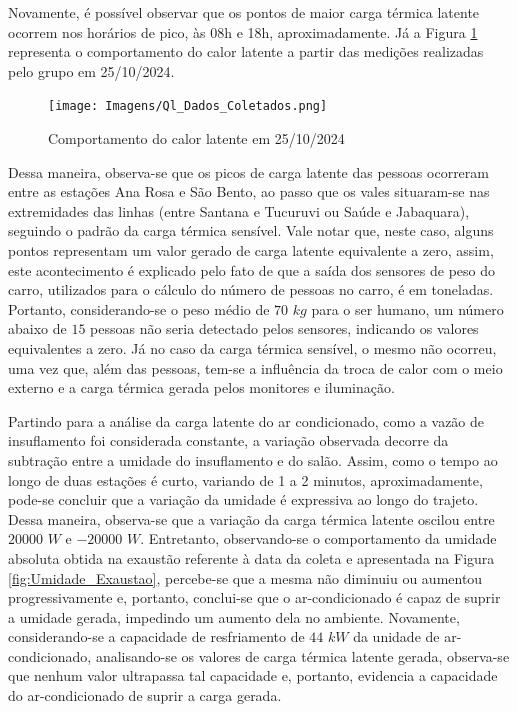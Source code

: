 \documentclass[acronym,symbols,table]{fei}
\begin{document}
Novamente, é possível observar que os pontos de maior carga térmica latente ocorrem nos horários de pico, às 08h e 18h, aproximadamente. Já a Figura \ref{fig:Ql_Dados_Coletados} representa o comportamento do calor latente a partir das medições realizadas pelo grupo em 25/10/2024.

\begin{figure}[!htb]
    \centering
    \caption{Comportamento do calor latente em 25/10/2024}
    \texttt{[image: Imagens/Ql\_Dados\_Coletados.png]}
    \label{fig:Ql_Dados_Coletados}
\end{figure}
\newpage
Dessa maneira, observa-se que os picos de carga latente das pessoas ocorreram entre as estações Ana Rosa e São Bento, ao passo que os vales situaram-se nas extremidades das linhas (entre Santana e Tucuruvi ou Saúde e Jabaquara), seguindo o padrão da carga térmica sensível. Vale notar que, neste caso, alguns pontos representam um valor gerado de carga latente equivalente a zero, assim, este acontecimento é explicado pelo fato de que a saída dos sensores de peso do carro, utilizados para o cálculo do número de pessoas no carro, é em toneladas. Portanto, considerando-se o peso médio de $70$ $kg$ para o ser humano, um número abaixo de $15$ pessoas não seria detectado pelos sensores, indicando os valores equivalentes a zero. Já no caso da carga térmica sensível, o mesmo não ocorreu, uma vez que, além das pessoas, tem-se a influência da troca de calor com o meio externo e a carga térmica gerada pelos monitores e iluminação.    

Partindo para a análise da carga latente do ar condicionado, como a vazão de insuflamento foi considerada constante, a variação observada decorre da subtração entre a umidade do insuflamento e do salão. Assim, como o tempo ao longo de duas estações é curto, variando de 1 a 2 minutos, aproximadamente, pode-se concluir que a variação da umidade é expressiva ao longo do trajeto. Dessa maneira, observa-se que a variação da carga térmica latente oscilou entre $20000$ $W$ e $-20000$ $W$. Entretanto, observando-se o comportamento da umidade absoluta obtida na exaustão referente à data da coleta e apresentada na Figura \ref{fig:Umidade_Exaustao}, percebe-se que a mesma não diminuiu ou aumentou progressivamente e, portanto, conclui-se que o ar-condicionado é capaz de suprir a umidade gerada, impedindo um aumento dela no ambiente. Novamente, considerando-se a capacidade de resfriamento de $44$ $kW$ da unidade de ar-condicionado, analisando-se os valores de carga térmica latente gerada, observa-se que nenhum valor ultrapassa tal capacidade e, portanto, evidencia a capacidade do ar-condicionado de suprir a carga gerada.
\end{document}
